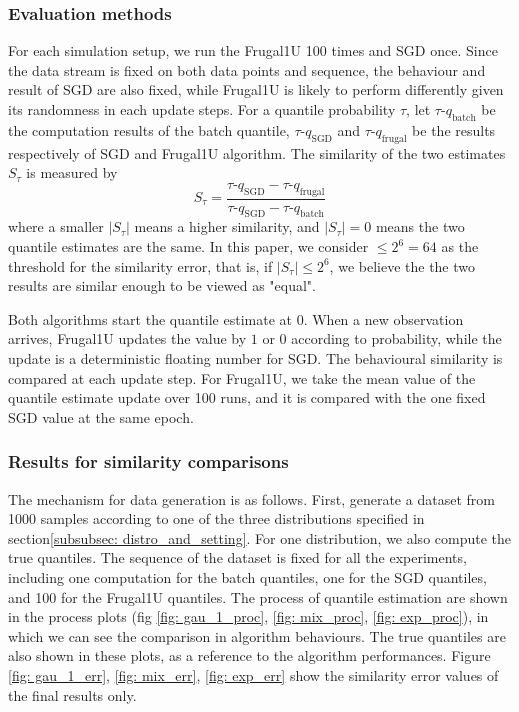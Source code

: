 \subsubsection{Evaluation methods}

For each simulation setup, we run the Frugal1U 100 times and SGD once. Since the data stream is fixed on both data points and sequence, the behaviour and result of SGD are also fixed, while Frugal1U is likely to perform differently given its randomness in each update steps. For a quantile probability $\tau$, let $\tau$-$q_{\text{batch}}$ be the computation results of the batch quantile, $\tau$-$q_{\text{SGD}}$ and $\tau$-$q_{\text{frugal}}$ be the results respectively of SGD and Frugal1U algorithm. The similarity of the two estimates $S_\tau$ is measured by
\begin{equation}
    S_\tau = \frac{ \tau\text{-}q_{\text{SGD}} - \tau\text{-}q_{\text{frugal}} }{ \tau\text{-}q_{\text{SGD}} - \tau\text{-}q_{\text{batch}} }
    \label{eq: frugal_err}
\end{equation}
where a smaller $|S_\tau|$ means a higher similarity, and $|S_\tau| = 0$ means the two quantile estimates are the same. In this paper, we consider $\leq 2^6 = 64$ as the threshold for the similarity error, that is, if $|S_\tau| \leq 2^6$, we believe the the two results are similar enough to be viewed as "equal".

Both algorithms start the quantile estimate at $0$. When a new observation arrives, Frugal1U updates the value by $1$ or $0$ according to probability, while the update is a deterministic floating number for SGD. The behavioural similarity is compared at each update step. For Frugal1U, we take the mean value of the quantile estimate update over 100 runs, and it is compared with the one fixed SGD value at the same epoch. 

\subsubsection{Results for similarity comparisons}

The mechanism for data generation is as follows. First, generate a dataset from 1000 samples according to one of the three distributions specified in section\ref{subsubsec: distro_and_setting}. For one distribution, we also compute the true quantiles. The sequence of the dataset is fixed for all the experiments, including one computation for the batch quantiles, one for the SGD quantiles, and 100 for the Frugal1U quantiles. The process of quantile estimation are shown in the process plots (fig \ref{fig: gau_1_proc}, \ref{fig: mix_proc}, \ref{fig: exp_proc}), in which we can see the comparison in algorithm behaviours. The true quantiles are also shown in these plots, as a reference to the algorithm performances.
Figure \ref{fig: gau_1_err}, \ref{fig: mix_err}, \ref{fig: exp_err} show the similarity error values of the final results only.

